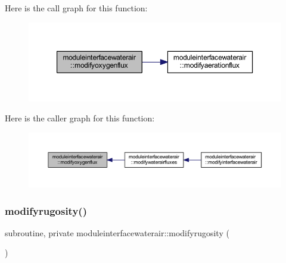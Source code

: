 Here is the call graph for this function\+:\nopagebreak
\begin{figure}[H]
\begin{center}
\leavevmode
\includegraphics[width=350pt]{namespacemoduleinterfacewaterair_ad4e148f79fe842f02dfc2fd7eb424091_cgraph}
\end{center}
\end{figure}
Here is the caller graph for this function\+:\nopagebreak
\begin{figure}[H]
\begin{center}
\leavevmode
\includegraphics[width=350pt]{namespacemoduleinterfacewaterair_ad4e148f79fe842f02dfc2fd7eb424091_icgraph}
\end{center}
\end{figure}
\mbox{\label{namespacemoduleinterfacewaterair_aa7f512949a9b145b55378017e58558a7}} 
\subsubsection{\texorpdfstring{modifyrugosity()}{modifyrugosity()}}
{\footnotesize\ttfamily subroutine, private moduleinterfacewaterair\+::modifyrugosity (\begin{DoxyParamCaption}{ }\end{DoxyParamCaption})\hspace{0.3cm}{\ttfamily [private]}}

